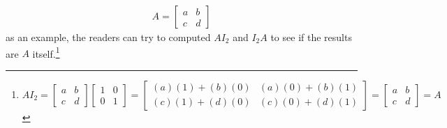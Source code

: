 \begin{align*}
A =
\begin{bmatrix}
a & b \\
c & d
\end{bmatrix}
\end{align*}
as an example, the readers can try to computed $AI_2$ and $I_2A$ to see if the results are $A$ itself.\footnote{
$AI_2 =
\begin{bmatrix}
a & b \\
c & d
\end{bmatrix}
\begin{bmatrix}
1 & 0 \\
0 & 1
\end{bmatrix}
=
\begin{bmatrix}
(a)(1) + (b)(0) & (a)(0) + (b)(1) \\
(c)(1) + (d)(0) & (c)(0) + (d)(1)
\end{bmatrix}
=
\begin{bmatrix}
a & b \\
c & d
\end{bmatrix}
= A$}

